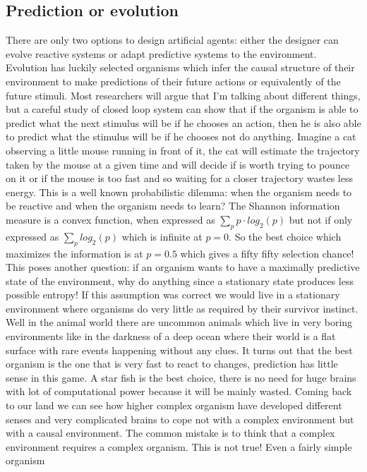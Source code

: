 \subsection{Prediction or evolution}
There are only two options to design artificial agents: either the designer 
can evolve reactive systems or adapt predictive systems to the environment.
Evolution has luckily selected organisms which infer the causal structure of
 their environment to make predictions of their future actions or equivalently of
 the future stimuli.
 Most researchers  will argue that I'm talking about different
 things, but a careful study of closed loop system can show that if the organism is
 able to predict what the next stimulus will be if he chooses an action, then he
 is also able to predict what the stimulus will be if he chooses not do anything.
Imagine a cat observing a little mouse running in front of it, the cat will estimate
 the trajectory taken by the mouse at a given time and will decide if is worth trying to pounce 
 on it or if the mouse is too fast and so waiting for a closer trajectory wastes less energy. 
 This is a well known probabilistic dilemma: when the organism needs to be reactive and when the organism 
 needs to learn?
 The Shannon information measure is a convex function, when expressed as $\sum_p p\cdot log_2(p)$ but 
 not if only expressed as $\sum_p log_2(p)$ which is infinite at $p=0$.
 So the best choice which maximizes the information is 
 at $p=0.5$ which gives a fifty fifty selection chance!
 This poses another question: if an organism wants to have
 a maximally predictive state of the environment, why do anything since a
 stationary state produces less possible entropy! If this assumption was correct
we would live in a stationary environment where organisms do very little as required
 by their survivor instinct. Well in the animal
world there are uncommon animals which live in very boring environments like
in the darkness of a deep ocean where their world is a flat surface with rare events
 happening without any clues. It turns out that the best organism is the one that is
very fast to react to changes, prediction has little sense in this game.
A star fish is the best choice, there is no need for huge brains with lot
of computational power because it will be mainly wasted. Coming back
 to our land we can see how higher complex organism have developed different
senses and very complicated brains to cope not with a complex environment but
with a causal environment. The common mistake is to think that a complex environment
 requires a complex organism. This is not true! Even a fairly simple organism
